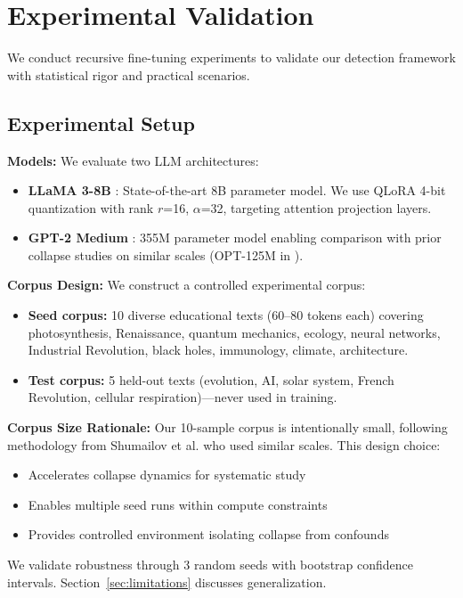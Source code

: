 \documentclass[conference]{IEEEtran}
\begin{document}
\section{Experimental Validation}

We conduct recursive fine-tuning experiments to validate our detection framework with statistical rigor and practical scenarios.

\subsection{Experimental Setup}

\textbf{Models:} We evaluate two LLM architectures:
\begin{itemize}
    \item \textbf{LLaMA 3-8B} \cite{llama3modelcard}: State-of-the-art 8B parameter model. We use QLoRA 4-bit quantization \cite{dettmers2023qlora} with rank $r$=16, $\alpha$=32, targeting attention projection layers.
    \item \textbf{GPT-2 Medium} \cite{radford2019language}: 355M parameter model enabling comparison with prior collapse studies on similar scales (OPT-125M in \cite{shumailov2024nature}).
\end{itemize}

\textbf{Corpus Design:} We construct a controlled experimental corpus:
\begin{itemize}
    \item \textbf{Seed corpus:} 10 diverse educational texts (60--80 tokens each) covering photosynthesis, Renaissance, quantum mechanics, ecology, neural networks, Industrial Revolution, black holes, immunology, climate, architecture.
    \item \textbf{Test corpus:} 5 held-out texts (evolution, AI, solar system, French Revolution, cellular respiration)---never used in training.
\end{itemize}

\textbf{Corpus Size Rationale:} Our 10-sample corpus is intentionally small, following methodology from Shumailov et al. \cite{shumailov2024nature} who used similar scales. This design choice:
\begin{itemize}
    \item Accelerates collapse dynamics for systematic study
    \item Enables multiple seed runs within compute constraints
    \item Provides controlled environment isolating collapse from confounds
\end{itemize}
We validate robustness through 3 random seeds with bootstrap confidence intervals. Section~\ref{sec:limitations} discusses generalization.
\end{document}
